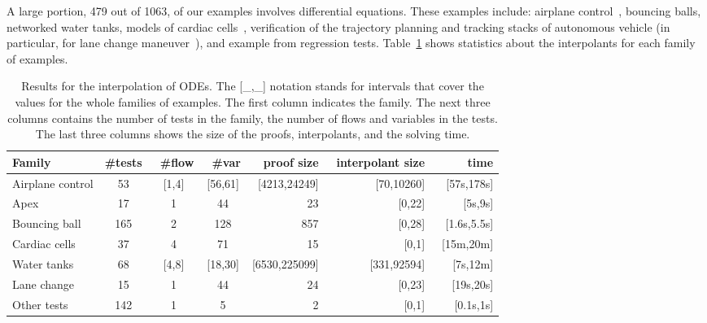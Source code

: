 A large portion, 479 out of 1063, of our examples involves differential equations.
These examples include:
airplane control~\cite{Bae201513},
bouncing balls, networked water tanks,
models of cardiac cells~\cite{DBLP:conf/cmsb/LiuKGZC14},
verification of the trajectory planning and tracking stacks of autonomous vehicle (in particular, for lane change maneuver~\cite{althoff2014online}),
and example from \dReal regression tests.
Table~\ref{tbl:ode} shows statistics about the interpolants for each family of examples.

\begin{table}
\centering
\begin{tabular}{l|cccrrr}
Family            & \#tests    & ~\#flow &  ~\#var  & proof size      & ~interpolant size & time \\
\hline
Airplane control  &       53   &  [1,4] & [56,61] & [4213,24249]    &  [70,10260]     &   [57s,178s]  \\
Apex              &       17   &   1    &  44     &          23     &  [0,22]         &    [5s,9s]    \\
Bouncing ball     &      165   &   2    &  128    &         857     &  [0,28]         &  [1.6s,5.5s]  \\
Cardiac cells     &       37   &   4    &  71     &          15     &  [0,1]          & ~[15m,20m]    \\
Water tanks       &       68   &  [4,8] & [18,30] & [6530,225099]   &  [331,92594]    &  [7s,12m]     \\
Lane change       &       15   &   1    &  44     &          24     &  [0,23]         &   [19s,20s]   \\
Other tests       &      142   &   1    &  5      &           2     &  [0,1]          &  [0.1s,1s]   
\end{tabular}

\vspace{1ex}

\caption{
    Results for the interpolation of ODEs.
    The [\_,\_] notation stands for intervals that cover the values for the whole families of examples.
    The first column indicates the family.
    The next three columns contains the number of tests in the family, the number of flows and variables in the tests.
    The last three columns shows the size of the proofs, interpolants, and the solving time.
}
\label{tbl:ode}
\end{table}

